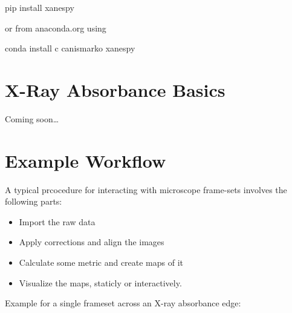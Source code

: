 \documentclass[letterpaper,10pt,english]{sphinxmanual}
\begin{document}
\begin{sphinxVerbatim}[commandchars=\\\{\}]
\PYGZdl{} pip install xanespy
\end{sphinxVerbatim}

or from anaconda.org using 

\begin{sphinxVerbatim}[commandchars=\\\{\}]
\PYGZdl{} conda install \PYGZhy{}c canismarko xanespy
\end{sphinxVerbatim}


\section{X-Ray Absorbance Basics}
\label{\detokenize{intro:x-ray-absorbance-basics}}
Coming soon…


\section{Example Workflow}
\label{\detokenize{intro:example-workflow}}
A typical prcocedure for interacting with microscope frame-sets involves the following parts:
\begin{itemize}
\item {} 
Import the raw data

\item {} 
Apply corrections and align the images

\item {} 
Calculate some metric and create maps of it

\item {} 
Visualize the maps, staticly or interactively.

\end{itemize}

Example for a single frameset across an X-ray absorbance edge:
\end{document}
